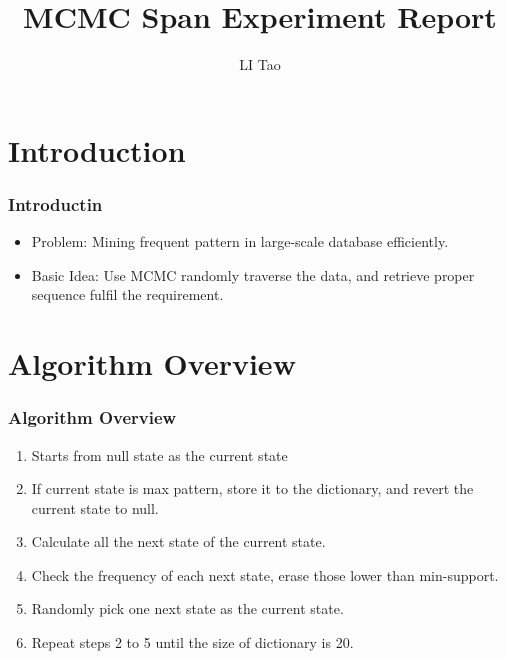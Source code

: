 \documentclass{beamer}
\begin{document}
\title{MCMC Span Experiment Report}
\author{LI Tao}

\begin{frame}
\titlepage
\end{frame}

\section{Introduction}
\begin{frame}\frametitle{Introductin}
\begin{itemize}
\item Problem: Mining frequent pattern in large-scale database efficiently.
\item Basic Idea: Use MCMC randomly traverse the data, and retrieve proper
sequence fulfil the requirement.
\end{itemize}
\end{frame}

\section{Algorithm Overview}
\begin{frame}\frametitle{Algorithm Overview}
\begin{enumerate}
\item Starts from null state as the current state 
\item If current state is max pattern, store it to the dictionary, and revert
the current state to null.
\item Calculate all the next state of the current state.
\item Check the frequency of each next state, erase those lower than
min-support.
\item Randomly pick one next state as the current state.
\item Repeat steps 2 to 5 until the size of dictionary is 20.
\end{enumerate}
\end{frame}
\end{document}
